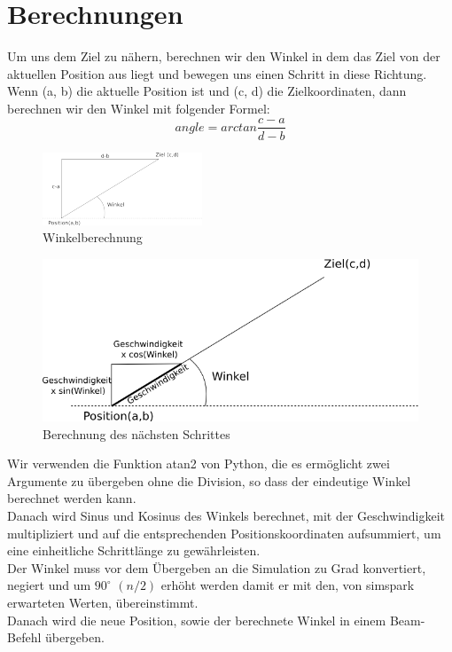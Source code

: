 \section{Berechnungen}
Um uns dem Ziel zu nähern, berechnen wir den Winkel in dem das Ziel von 
der aktuellen Position aus liegt und bewegen uns einen Schritt in diese 
Richtung. \\   
Wenn (a, b) die aktuelle Position ist und (c, d) die Zielkoordinaten, dann berechnen wir den Winkel mit folgender Formel:\\
\begin{equation}
angle = arctan \frac{c - a}{d -b}
\end{equation}
\begin{figure}
\begin{center}
\includegraphics[scale=1]{180px-Winkel}
\end{center}
\caption{Winkelberechnung}
\end{figure}
\begin{figure}
\begin{center}
\includegraphics[scale=0.6]{geschwindigkeit}
\end{center}
\caption{Berechnung des nächsten Schrittes}
\end{figure}
Wir verwenden die Funktion atan2 von Python, die es ermöglicht 
zwei Argumente zu übergeben ohne die Division, so dass der eindeutige 
Winkel berechnet werden kann.\\
Danach wird Sinus und Kosinus des Winkels berechnet, mit der 
Geschwindigkeit multipliziert und auf die entsprechenden 
Positionskoordinaten aufsummiert, um eine einheitliche Schrittlänge zu 
gewährleisten.\\
Der Winkel muss vor dem Übergeben an die Simulation zu Grad 
konvertiert, negiert und um $90^\circ$ $(n/2)$ erhöht werden damit er mit den, 
von simspark erwarteten Werten, übereinstimmt.\\
Danach wird die neue Position, sowie der berechnete Winkel in einem Beam-Befehl übergeben.

